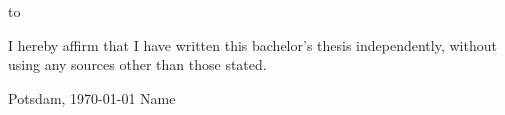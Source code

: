 \thispagestyle{empty}
\vspace*{24\baselineskip}
\hbox to \textwidth{\hrulefill}
\par
I hereby affirm that I have written this bachelor's thesis independently, without using any sources other than those stated.

Potsdam, {\today}
\newline
\newline
\newline
\newline
\newline
Name

\clearpage